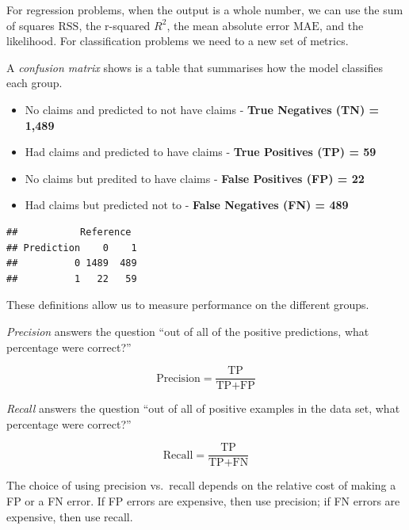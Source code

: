 \documentclass[
  openany]{book}
\newenvironment{Shaded}{\begin{snugshade}}{\end{snugshade}}
\newcommand{\KeywordTok}[1]{\textcolor[rgb]{0.13,0.29,0.53}{\textbf{#1}}}
\newcommand{\NormalTok}[1]{#1}
\newcommand{\OperatorTok}[1]{\textcolor[rgb]{0.81,0.36,0.00}{\textbf{#1}}}
\providecommand{\tightlist}{%
  \setlength{\itemsep}{0pt}\setlength{\parskip}{0pt}}
\begin{document}
For regression problems, when the output is a whole number, we can use the sum of squares \(\text{RSS}\), the r-squared \(R^2\), the mean absolute error \(\text{MAE}\), and the likelihood. For classification problems we need to a new set of metrics.

A \emph{confusion matrix} shows is a table that summarises how the model classifies each group.

\begin{itemize}
\tightlist
\item
  No claims and predicted to not have claims - \textbf{True Negatives (TN) = 1,489}
\item
  Had claims and predicted to have claims - \textbf{True Positives (TP) = 59}
\item
  No claims but predited to have claims - \textbf{False Positives (FP) = 22}
\item
  Had claims but predicted not to - \textbf{False Negatives (FN) = 489}
\end{itemize}

\begin{Shaded}
\end{Shaded}

\begin{verbatim}
##           Reference
## Prediction    0    1
##          0 1489  489
##          1   22   59
\end{verbatim}

These definitions allow us to measure performance on the different groups.

\emph{Precision} answers the question ``out of all of the positive predictions, what percentage were correct?''

\[\text{Precision} = \frac{\text{TP}}{\text{TP} + \text{FP}}\]

\emph{Recall} answers the question ``out of all of positive examples in the data set, what percentage were correct?''

\[\text{Recall} = \frac{\text{TP}}{\text{TP} + \text{FN}}\]

The choice of using precision vs.~recall depends on the relative cost of making a FP or a FN error. If FP errors are expensive, then use precision; if FN errors are expensive, then use recall.
\end{document}
